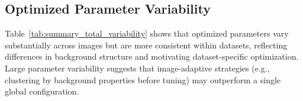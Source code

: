 \documentclass[iucr]{iucrjournals}
\begin{document}
\subsection{Optimized Parameter Variability}




Table~\ref{tab:summary_total_variability} shows that optimized parameters vary substantially across images but are more consistent within datasets, reflecting differences in background structure and motivating dataset-specific optimization.
Large parameter variability suggests that image-adaptive strategies (e.g., clustering by background properties before tuning) may outperform a single global configuration.



\end{document}
